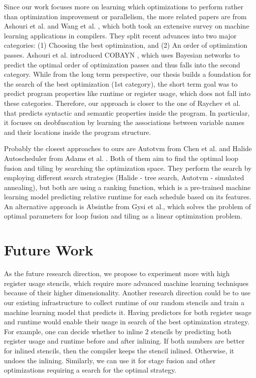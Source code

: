 \documentclass[sigplan,\review anonymous]{acmart}
\begin{document}
Since our work focuses more on learning which optimizations to perform rather
than optimization improvement or parallelism, the more related papers are from
Ashouri et al. \cite{Ashouri_survey} and Wang et al. \cite{wang2018survey},
which both took an extensive survey on machine learning applications in
compilers. They split recent advances into two major categories: (1) Choosing
the best optimization, and (2) An order of optimization passes. Ashouri et al.
introduced COBAYN \cite{Ashouri_cobayn}, which uses Bayesian networks to
predict the optimal order of optimization passes and thus falls into the
second category. While from the long term perspective, our thesis builds a
foundation for the search of the best optimization (1st category), the short
term goal was to predict program properties like runtime or register usage,
which does not fall into these categories. Therefore, our approach is closer
to the one of Raychev et al. \cite{raychev} that predicts syntactic and
semantic properties inside the program. In particular, it focuses on
deobfuscation by learning the associations between variable names and their
locations inside the program structure.

Probably the closest approaches to ours are Autotvm from Chen et al.
\cite{autotvm} and Halide Autoscheduler from Adams et al. \cite{halide_ml}.
Both of them aim to find the optimal loop fusion and tiling by searching
the optimization space. They perform the search by employing different search
strategies (Halide - tree search, Autotvm - simulated annealing),
but both are using a ranking function, which is a pre-trained machine
learning model predicting relative runtime for each schedule based on its
features. An alternative approach is Absinthe \cite{Absinthe} from Gysi et al.,
which solves the problem of optimal parameters for loop fusion and tiling as
a linear optimization problem.

\section{Future Work}
As the future research direction, we propose to experiment more with high
register usage stencils, which require more advanced machine learning
techniques because of their higher dimensionality. Another research direction
could be to use our existing infrastructure to collect runtime of our random
stencils and train a machine learning model that predicts it. Having predictors
for both register usage and runtime would enable their usage in search of the
best optimization strategy. For example, one can decide whether to inline 2
stencils by predicting both register usage and runtime before and after
inlining. If both numbers are better for inlined stencils, then the compiler
keeps the stencil inlined. Otherwise, it undoes the inlining. Similarly, we
can use it for stage fusion and other optimizations requiring a search for
the optimal strategy. 
\end{document}
